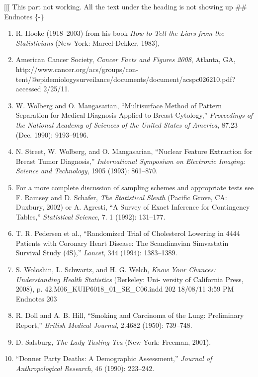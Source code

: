 \documentclass[
]{report}
\begin{document}
\begin{list}{E.}{ \setlength{\itemsep}{0.5em}}
\end{list}

{[}{[}{[} This part not working. All the text under the heading is not showing up
\#\# Endnotes \{-\}

\begin{enumerate}

\item R. Hooke (1918–2003) from his book \textit{How to Tell the Liars from the Statisticians} (New York: Marcel-Dekker, 1983),
\item American Cancer Society, \textit{Cancer Facts and Figures 2008}, Atlanta, GA, http://www.cancer.org/acs/groups/con-
tent/@epidemiologysurveilance/documents/document/acspc026210.pdf? accessed 2/25/11.
\item W. Wolberg and O. Mangasarian, “Multisurface Method of Pattern Separation for Medical Diagnosis Applied to
Breast Cytology,” \textit{Proceedings of the National Academy of Sciences of the United States of America}, 87.23 (Dec.
1990): 9193–9196.
\item N. Street, W. Wolberg, and O. Mangasarian, “Nuclear Feature Extraction for Breast Tumor Diagnosis,” \textit{International
Symposium on Electronic Imaging: Science and Technology}, 1905 (1993): 861–870.
\item For a more complete discussion of sampling schemes and appropriate tests see F. Ramsey and D. Schafer, \textit{The
Statistical Sleuth} (Pacific Grove, CA: Duxbury, 2002) or A. Agresti, “A Survey of Exact Inference for Contingency
Tables,” \textit{Statistical Science}, 7. 1 (1992): 131–177.
\item T. R. Pedersen et al., “Randomized Trial of Cholesterol Lowering in 4444 Patients with Coronary Heart Disease:
The Scandinavian Simvastatin Survival Study (4S),” \textit{Lancet}, 344 (1994): 1383–1389.
\item S. Woloshin, L. Schwartz, and H. G. Welch, \textit{Know Your Chances: Understanding Health Statistics} (Berkeley: Uni-
versity of California Press, 2008), p. 42.M06\_KUIP6018\_01\_SE\_C06.indd 202 18/08/11 3:59 PM Endnotes 203
\item R. Doll and A. B. Hill, “Smoking and Carcinoma of the Lung: Preliminary Report,” \textit{British Medical Journal}, 2.4682
(1950): 739–748.
\item D. Salsburg, \textit{The Lady Tasting Tea} (New York: Freeman, 2001).
\item “Donner Party Deaths: A Demographic Assessment,” \textit{Journal of Anthropological Research}, 46 (1990): 223–242.

\end{enumerate}
\end{document}
